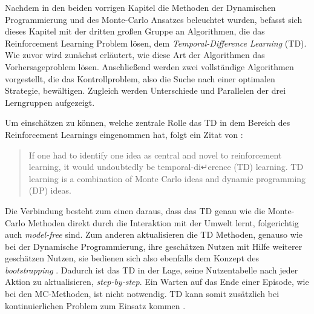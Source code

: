
Nachdem in den beiden vorrigen Kapitel die Methoden der Dynamischen Programmierung und des Monte-Carlo Ansatzes beleuchtet wurden, befasst sich dieses Kapitel mit der dritten großen Gruppe an Algorithmen, die das Reinforcement Learning Problem lösen, dem \textit{Temporal-Difference Learning} (TD).
Wie zuvor wird zunächst erläutert, wie diese Art der Algorithmen das Vorhersageproblem lösen. Anschließend werden zwei vollständige Algorithmen vorgestellt, die das Kontrollproblem, also die Suche nach einer optimalen Strategie, bewältigen. Zugleich werden Unterschiede und Parallelen der drei Lerngruppen aufgezeigt.
\par 
Um einschätzen zu können, welche zentrale Rolle das TD in dem Bereich des Reinforcement Learnings eingenommen hat, folgt ein Zitat von \cite{Sutton1998}:
\begin{quote}
    If one had to identify one idea as central and novel to reinforcement learning, it would undoubtedly be temporal-di↵erence (TD) learning. TD learning is a combination of Monte Carlo ideas and dynamic programming (DP) ideas. \cite[S.~119]{Sutton1998}
\end{quote}

Die Verbindung besteht zum einen daraus, dass das TD genau wie die Monte-Carlo Methoden direkt durch die Interaktion mit der Umwelt lernt, folgerichtig auch \textit{model-free} sind. Zum anderen aktualisieren die TD Methoden, genauso wie bei der Dynamische Programmierung, ihre geschätzen Nutzen mit Hilfe weiterer geschätzen Nutzen, sie bedienen sich also ebenfalls dem Konzept des \textit{bootstrapping} \cite[S.~119]{Sutton1998}. Dadurch ist das TD in der Lage, seine Nutzentabelle nach jeder Aktion zu aktualisieren, \textit{step-by-step}. Ein Warten auf das Ende einer Episode, wie bei den MC-Methoden, ist nicht notwendig. TD kann somit zusätzlich bei kontinuierlichen Problem zum Einsatz kommen \cite[S.~124]{Sutton1998}.
\par 


